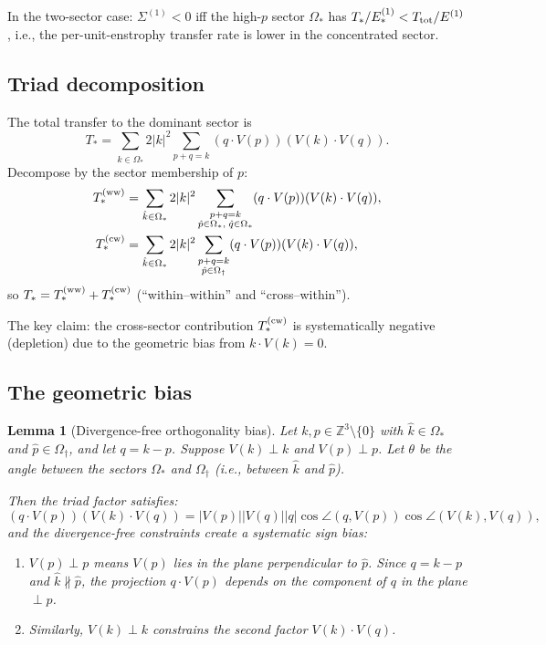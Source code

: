 \documentclass[11pt]{article}
\newtheorem{lemma}[theorem]{Lemma}
\theoremstyle{definition}
\newcommand{\Z}{\mathbb{Z}}
\begin{document}
In the two-sector case: $\Sigma^{(1)}<0$ iff
the high-$p$ sector $\Omega_*$ has
$T_*/E_*^{(1)} < T_{\rm tot}/E^{(1)}$,
i.e., the per-unit-enstrophy transfer rate
is lower in the concentrated sector.


\subsection{Triad decomposition}

The total transfer to the dominant sector is
\begin{equation}
T_* = \sum_{\hat k\in\Omega_*}
2|k|^2\sum_{p+q=k}
(q\cdot V(p))(V(k)\cdot V(q)).
\end{equation}
Decompose by the sector membership of $p$:
\begin{align}
T_*^{(\rm ww)} &= \sum_{\hat k\in\Omega_*}
2|k|^2\sum_{\substack{p+q=k\\
\hat p\in\Omega_*,\;\hat q\in\Omega_*}}
(q\cdot V(p))(V(k)\cdot V(q)),
\label{eq:Tww}\\
T_*^{(\rm cw)} &= \sum_{\hat k\in\Omega_*}
2|k|^2\sum_{\substack{p+q=k\\
\hat p\in\Omega_\dagger}}
(q\cdot V(p))(V(k)\cdot V(q)),
\label{eq:Tcw}
\end{align}
so $T_* = T_*^{(\rm ww)}+T_*^{(\rm cw)}$
(``within--within'' and ``cross--within'').

The key claim: the cross-sector contribution
$T_*^{(\rm cw)}$ is systematically negative
(depletion) due to the geometric bias from
$k\cdot V(k)=0$.


\subsection{The geometric bias}

\begin{lemma}[Divergence-free orthogonality
bias]\label{lem:geom}
Let $k,p\in\Z^3\setminus\{0\}$ with
$\hat k\in\Omega_*$ and $\hat p\in\Omega_\dagger$,
and let $q = k-p$.  Suppose $V(k)\perp k$ and
$V(p)\perp p$.  Let $\theta$ be the angle between
the sectors $\Omega_*$ and $\Omega_\dagger$
(i.e., between $\hat k$ and $\hat p$).

Then the triad factor satisfies:
\begin{equation}
(q\cdot V(p))(V(k)\cdot V(q))
= |V(p)||V(q)||q|
\cos\angle(q,V(p))\cos\angle(V(k),V(q)),
\end{equation}
and the divergence-free constraints create
a systematic sign bias:
\begin{enumerate}
\item $V(p)\perp p$ means $V(p)$ lies in the
  plane perpendicular to $\hat p$.  Since
  $q = k-p$ and $\hat k\not\parallel\hat p$,
  the projection $q\cdot V(p)$ depends on the
  component of $q$ in the plane $\perp p$.
\item Similarly, $V(k)\perp k$ constrains
  the second factor $V(k)\cdot V(q)$.
\end{enumerate}
\end{lemma}
\end{document}
